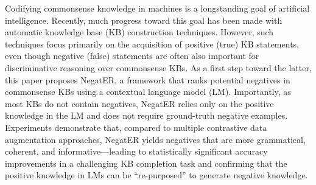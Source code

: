 Codifying commonsense knowledge in machines is a longstanding goal of artificial intelligence. Recently, much progress toward this goal has been made with automatic knowledge base (KB) construction techniques. However, such techniques focus primarily on the acquisition of positive (true) KB statements, even though negative (false) statements are often also important for discriminative reasoning over commonsense KBs. As a first step toward the latter, this paper proposes NegatER, a framework that ranks potential negatives in commonsense KBs using a contextual language model (LM). Importantly, as most KBs do not contain negatives, NegatER relies only on the positive knowledge in the LM and does not require ground-truth negative examples. Experiments demonstrate that, compared to multiple contrastive data augmentation approaches, NegatER yields negatives that are more grammatical, coherent, and informative---leading to statistically significant accuracy improvements in a challenging KB completion task and confirming that the positive knowledge in LMs can be ``re-purposed'' to generate negative knowledge.
